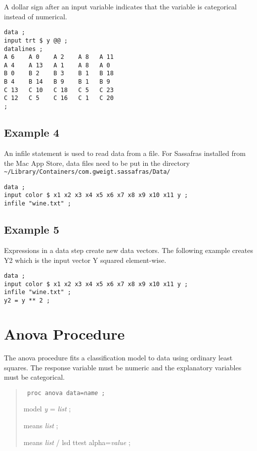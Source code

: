 \documentclass[12pt]{article}
\begin{document}
A dollar sign after an input variable indicates that the variable
is categorical instead of numerical.

{\scriptsize\begin{verbatim}
data ;
input trt $ y @@ ;
datalines ;
A 6    A 0    A 2    A 8   A 11
A 4    A 13   A 1    A 8   A 0
B 0    B 2    B 3    B 1   B 18
B 4    B 14   B 9    B 1   B 9
C 13   C 10   C 18   C 5   C 23
C 12   C 5    C 16   C 1   C 20
;
\end{verbatim}}

\subsection*{Example 4}

An infile statement is used to read data from a file.
For Sassafras installed from the Mac App Store,
data files need to be put in the directory
{\scriptsize\verb$~/Library/Containers/com.gweigt.sassafras/Data/$}

{\scriptsize\begin{verbatim}
data ;
input color $ x1 x2 x3 x4 x5 x6 x7 x8 x9 x10 x11 y ;
infile "wine.txt" ;
\end{verbatim}}

\subsection*{Example 5}

Expressions in a data step create new data vectors.
The following example creates Y2 which is the input
vector Y squared element-wise.

{\scriptsize\begin{verbatim}
data ;
input color $ x1 x2 x3 x4 x5 x6 x7 x8 x9 x10 x11 y ;
infile "wine.txt" ;
y2 = y ** 2 ;
\end{verbatim}}

\newpage

\section{Anova Procedure}

The anova procedure fits a classification model
to data using ordinary least squares.
The response variable must be numeric and the
explanatory variables must be categorical.

\begin{quote}
{\tt
proc anova data={\it name} ;

model {\it y} = {\it list} ;

means {\it list} ;

means {\it list} / lsd ttest alpha={\it value} ;
}
\end{quote}
\end{document}
